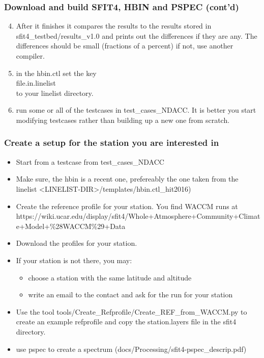 \documentclass[notes=hide]{beamer}
\begin{document}
\begin{frame}
  \frametitle{Download and build SFIT4, HBIN and PSPEC (cont'd)}
  \begin{enumerate}
    \setcounter{enumi}{3}
  \item After it finishes it compares the results to the results
    stored in sfit4\_testbed/results\_v1.0 and prints out the differences
    if they are any. The differences should be small (fractions of a
    percent) if not, use another compiler.
  \item in the hbin.ctl set the key\\
    file.in.linelist\\
    to your linelist directory.
  \item run some or all of the testcases in test\_cases\_NDACC. It is
    better you start modifying testcases rather than building up a new
    one from scratch.
  \end{enumerate}
\end{frame}

\begin{frame}
  \frametitle{Create a setup for the station you are interested in}
  \begin{itemize}
  \item Start from a testcase from test\_cases\_NDACC
  \item Make sure, the hbin is a recent one, prefereably the one taken from the
    linelist <LINELIST-DIR>/templates/hbin.ctl\_hit2016)
  \item Create the reference profile for your station. You find WACCM runs at
    https://wiki.ucar.edu/display/sfit4/Whole+Atmosphere+Community+Climate+Model+\%28WACCM\%29+Data
  \item Download the profiles for your station.
  \item If your station is not there, you may:
    \begin{itemize}
    \item choose a station with the same latitude and altitude
    \item write an email to the contact and ask for the run for your station
    \end{itemize}
  \item Use the tool tools/Create\_Refprofile/Create\_REF\_from\_WACCM.py to create an example
    refprofile and copy the station.layers file in the sfit4 directory.
  \item use pspec to create a spectrum (docs/Processing/sfit4-pspec\_descrip.pdf) 
  \end{itemize}
\end{frame}
  
\end{document}
